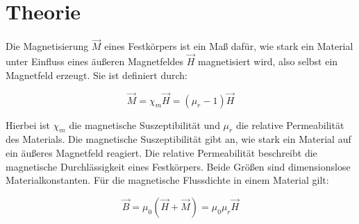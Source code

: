 \section{Theorie}

Die Magnetisierung $\vec{M}$ eines Festkörpers ist ein Maß dafür, wie stark ein Material unter Einfluss
eines äußeren Magnetfeldes \(\vec{H}\) magnetisiert wird, also selbst ein Magnetfeld erzeugt.
Sie ist definiert durch:

\begin{equation}
    \vec{M} = \chi_m \vec{H} = (\mu_r - 1) \vec{H}
    \label{eq:Magnetisierung}
\end{equation}

Hierbei ist $\chi_m$ die magnetische Suszeptibilität und $\mu_r$ die relative Permeabilität des Materials.
Die magnetische Suszeptibilität gibt an, wie stark ein Material auf ein äußeres Magnetfeld reagiert. 
Die relative Permeabilität beschreibt die magnetische Durchlässigkeit eines Festkörpers.
Beide Größen sind dimensionslose Materialkonstanten. Für die magnetische Flussdichte in einem Material gilt:

\begin{equation}
    \vec{B} = \mu_0 (\vec{H} + \vec{M}) = \mu_0 \mu_r \vec{H}
    \label{eq:Flussdichte}
\end{equation}

